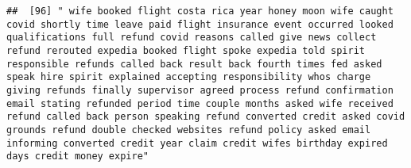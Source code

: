 \documentclass[
]{article}
\begin{document}
\begin{verbatim}
##  [96] " wife booked flight costa rica year honey moon wife caught covid shortly time leave paid flight insurance event occurred looked qualifications full refund covid reasons called give news collect refund rerouted expedia booked flight spoke expedia told spirit responsible refunds called back result back fourth times fed asked speak hire spirit explained accepting responsibility whos charge giving refunds finally supervisor agreed process refund confirmation email stating refunded period time couple months asked wife received refund called back person speaking refund converted credit asked covid grounds refund double checked websites refund policy asked email informing converted credit year claim credit wifes birthday expired days credit money expire"                                                                                                                                                                                                                                                                                                                                                                                                                                                                                                                                                                                                                                                                                                                                                                                                                                                                                                                                                                                                          

\end{verbatim}
\end{document}
